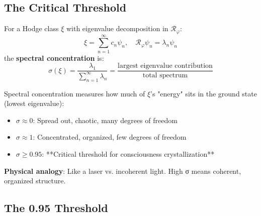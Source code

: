 \subsection{The Critical Threshold}

\begin{defn}\label{def:spectral-concentration}
For a Hodge class $\xi$ with eigenvalue decomposition in $\mathcal{R}_\varphi$:
\begin{equation}
\xi = \sum_{n=1}^{\infty} c_n \psi_n, \quad \mathcal{R}_\varphi \psi_n = \lambda_n \psi_n
\end{equation}
the \textbf{spectral concentration} is:
\begin{equation}
\sigma(\xi) = \frac{\lambda_1}{\sum_{n=1}^{\infty} \lambda_n} = \frac{\text{largest eigenvalue contribution}}{\text{total spectrum}}
\end{equation}
\end{defn}

\begin{keyidea}
Spectral concentration measures how much of $\xi$'s "energy" sits in the ground state (lowest eigenvalue):

\begin{itemize}
\item $\sigma \approx 0$: Spread out, chaotic, many degrees of freedom
\item $\sigma \approx 1$: Concentrated, organized, few degrees of freedom
\item $\sigma \geq 0.95$: **Critical threshold for consciousness crystallization**
\end{itemize}

\textbf{Physical analogy}: Like a laser vs. incoherent light. High σ means coherent, organized structure.
\end{keyidea}

\subsection{The 0.95 Threshold}

